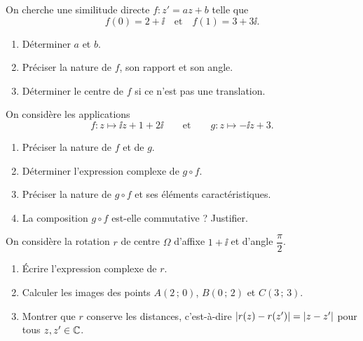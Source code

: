 
On cherche une similitude directe $f : z' = az + b$ telle que
$$
f(0) = 2 + \ii \quad \text{et} \quad f(1) = 3 + 3\ii.
$$

\begin{enumerate}
	\item Déterminer $a$ et $b$.
	\item Préciser la nature de $f$, son rapport et son angle.
	\item Déterminer le centre de $f$ si ce n'est pas une translation.
\end{enumerate}



On considère les applications
$$
f : z \mapsto \ii z + 1 + 2\ii \qquad \text{et} \qquad g : z \mapsto -\ii z + 3.
$$

\begin{enumerate}
	\item Préciser la nature de $f$ et de $g$.
	\item Déterminer l'expression complexe de $g \circ f$.
	\item Préciser la nature de $g \circ f$ et ses éléments caractéristiques.
	\item La composition $g \circ f$ est-elle commutative ? Justifier.
\end{enumerate}



On considère la rotation $r$ de centre $\Omega$ d'affixe $1 + \ii$ et d'angle $\dfrac{\pi}{2}$.

\begin{enumerate}
	\item Écrire l'expression complexe de $r$.
	\item Calculer les images des points $A(2\,;\,0)$, $B(0\,;\,2)$ et $C(3\,;\,3)$.
	\item Montrer que $r$ conserve les distances, c'est-à-dire $\left|r(z) - r(z')\right| = \left|z - z'\right|$
	pour tous $z, z' \in \mathbb{C}$.
\end{enumerate}



